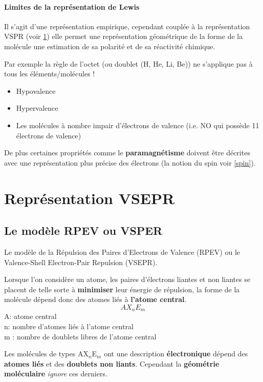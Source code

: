 \documentclass[10pt,a4paper]{book}
\begin{document}
\paragraph{Limites de la représentation de Lewis} Il s'agit d'une représentation empirique, cependant couplée à la représentation VSPR (voir \ref{VSPR}) elle permet une représentation géométrique de la forme de la molécule une estimation de sa polarité et de sa réactivité chimique. \par
Par exemple la règle de l’octet (ou doublet (H, He, Li, Be)) ne s’applique pas à tous les éléments/molécules !
\begin{itemize}
\item Hypovalence
\item Hypervalence
\item Les molécules à nombre impair d'électrons de valence (i.e. NO qui possède 11 électrons de valence)
\end{itemize}
De plus certaines propriétés comme le \textbf{paramagnétisme} doivent être décrites avec une représentation plus précise des électrons (la notion du spin voir \ref{spin}).

\section{Représentation VSEPR} \label{VSPR}

\subsection{Le modèle RPEV ou VSPER}

Le modèle de la Répulsion des Paires d’Electrons de Valence (RPEV) ou le Valence-Shell Electron-Pair Repulsion (VSEPR). \par
Lorsque l'on considère un atome, les paires d’électrons liantes et non liantes se placent de telle sorte à \textbf{minimiser} leur énergie de répulsion, la forme de la molécule dépend donc des atomes liés à \textbf{l'atome central}.
\begin{displaymath}
AX_nE_m
\end{displaymath}
A: atome central \\
n: nombre d’atomes liés à l’atome central \\
m : nombre de doublets libres de l’atome central \\ \par
Les molécules de types AX$_n$E$_m$ ont une description \textbf{électronique} dépend des \textbf{atomes liés} et des \textbf{doublets non liants}. Cependant la \textbf{géométrie moléculaire} \textit{ignore} ces derniers.
\end{document}
